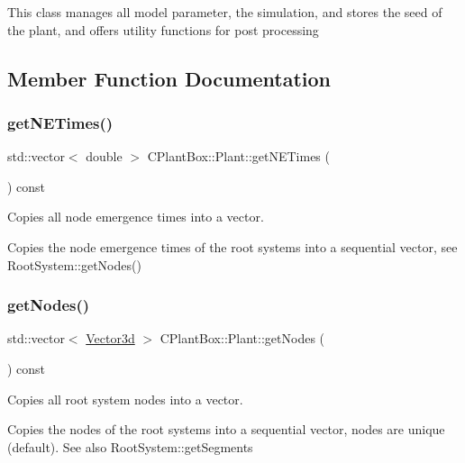 This class manages all model parameter, the simulation, and stores the seed of the plant, and offers utility functions for post processing 

\subsection{Member Function Documentation}
\mbox{\label{classCPlantBox_1_1Plant_af0d957301cf8a6e46f9aef0970d04b9b}} 
\subsubsection{\texorpdfstring{get\+N\+E\+Times()}{getNETimes()}}
{\footnotesize\ttfamily std\+::vector$<$ double $>$ C\+Plant\+Box\+::\+Plant\+::get\+N\+E\+Times (\begin{DoxyParamCaption}{ }\end{DoxyParamCaption}) const}



Copies all node emergence times into a vector. 

Copies the node emergence times of the root systems into a sequential vector, see Root\+System\+::get\+Nodes() \mbox{\label{classCPlantBox_1_1Plant_ae6730cc4a8296f575f597eb7f2e3cb2f}} 
\subsubsection{\texorpdfstring{get\+Nodes()}{getNodes()}}
{\footnotesize\ttfamily std\+::vector$<$ \hyperlink{classCPlantBox_1_1Vector3d}{Vector3d} $>$ C\+Plant\+Box\+::\+Plant\+::get\+Nodes (\begin{DoxyParamCaption}{ }\end{DoxyParamCaption}) const}



Copies all root system nodes into a vector. 

Copies the nodes of the root systems into a sequential vector, nodes are unique (default). See also Root\+System\+::get\+Segments \mbox{\label{classCPlantBox_1_1Plant_a035d0e26fbeb802896834dd73d4fcd22}} 
